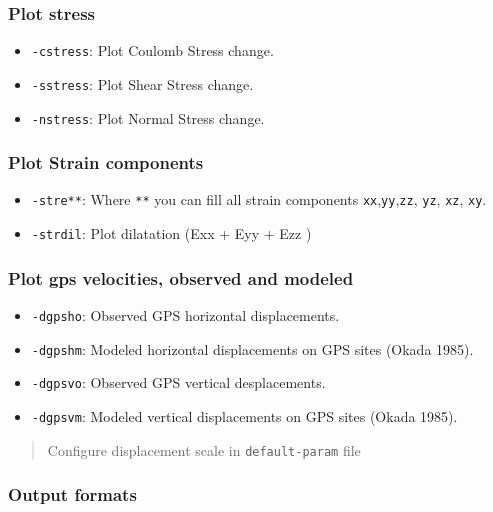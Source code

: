 \subsubsection{Plot stress}\label{plot-stress}

\begin{itemize}
\item
  \texttt{-cstress}: Plot Coulomb Stress change.
\item
  \texttt{-sstress}: Plot Shear Stress change.
\item
  \texttt{-nstress}: Plot Normal Stress change.
\end{itemize}

\subsubsection{Plot Strain components}\label{plot-strain-components}

\begin{itemize}
\item
  \texttt{-stre**}: Where \texttt{**} you can fill all strain components
  \texttt{xx},\texttt{yy},\texttt{zz}, \texttt{yz}, \texttt{xz},
  \texttt{xy}.
\item
  \texttt{-strdil}: Plot dilatation (Exx + Eyy + Ezz )
\end{itemize}

\subsubsection{Plot gps velocities, observed and
modeled}\label{plot-gps-velocities-observed-and-modeled}

\begin{itemize}
\item
  \texttt{-dgpsho}: Observed GPS horizontal displacements.
\item
  \texttt{-dgpshm}: Modeled horizontal displacements on GPS sites (Okada
  1985).
\item
  \texttt{-dgpsvo}: Observed GPS vertical desplacements.
\item
  \texttt{-dgpsvm}: Modeled vertical displacements on GPS sites (Okada
  1985).
\end{itemize}

\begin{quote}
Configure displacement scale in \texttt{default-param} file
\end{quote}

\subsubsection{Output formats}\label{output-formats}

